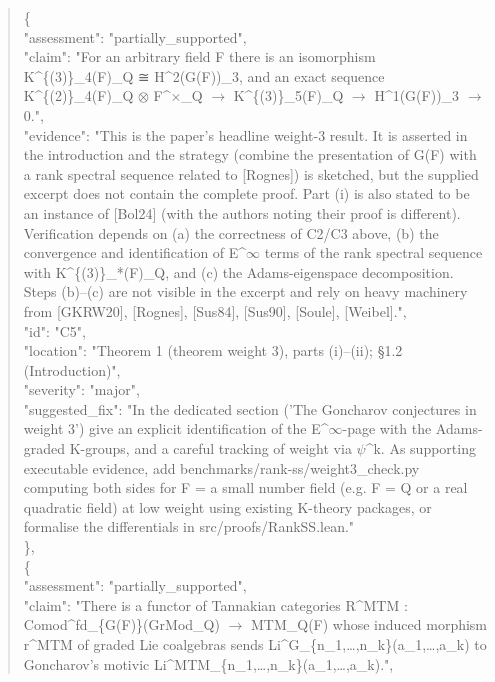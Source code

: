 \documentclass[11pt]{article}
\begin{document}
\begin{quote}
    \{\\
      "assessment": "partially\_supported",\\
      "claim": "For an arbitrary field F there is an isomorphism K\^{}\{(3)\}\_4(F)\_Q ≅ H\^{}2(G(F))\_3, and an exact sequence K\^{}\{(2)\}\_4(F)\_Q \ensuremath{\otimes} F\^{}\ensuremath{\times}\_Q \ensuremath{\to} K\^{}\{(3)\}\_5(F)\_Q \ensuremath{\to} H\^{}1(G(F))\_3 \ensuremath{\to} 0.",\\
      "evidence": "This is the paper's headline weight-3 result. It is asserted in the introduction and the strategy (combine the presentation of G(F) with a rank spectral sequence related to [Rognes]) is sketched, but the supplied excerpt does not contain the complete proof. Part (i) is also stated to be an instance of [Bol24] (with the authors noting their proof is different). Verification depends on (a) the correctness of C2/C3 above, (b) the convergence and identification of E\^{}\ensuremath{\infty} terms of the rank spectral sequence with K\^{}\{(3)\}\_*(F)\_Q, and (c) the Adams-eigenspace decomposition. Steps (b)--(c) are not visible in the excerpt and rely on heavy machinery from [GKRW20], [Rognes], [Sus84], [Sus90], [Soule], [Weibel].",\\
      "id": "C5",\\
      "location": "Theorem 1 (theorem weight 3), parts (i)--(ii); §1.2 (Introduction)",\\
      "severity": "major",\\
      "suggested\_fix": "In the dedicated section ('The Goncharov conjectures in weight 3') give an explicit identification of the E\^{}\ensuremath{\infty}-page with the Adams-graded K-groups, and a careful tracking of weight via \ensuremath{\psi}\^{}k. As supporting executable evidence, add benchmarks/rank-ss/weight3\_check.py computing both sides for F = a small number field (e.g. F = Q or a real quadratic field) at low weight using existing K-theory packages, or formalise the differentials in src/proofs/RankSS.lean."\\
    \},\\
    \{\\
      "assessment": "partially\_supported",\\
      "claim": "There is a functor of Tannakian categories R\^{}MTM : Comod\^{}fd\_\{G(F)\}(GrMod\_Q) \ensuremath{\to} MTM\_Q(F) whose induced morphism r\^{}MTM of graded Lie coalgebras sends Li\^{}G\_\{n\_1,…,n\_k\}(a\_1,…,a\_k) to Goncharov's motivic Li\^{}MTM\_\{n\_1,…,n\_k\}(a\_1,…,a\_k).",\\

\end{quote}
\end{document}
